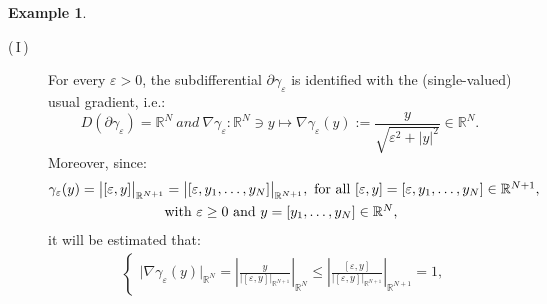 \documentclass{sinst}
\numberwithin{equation}{section}
\theoremstyle{plain}
\theoremstyle{definition}
\newtheorem{ex}{Example}
\def\R{\mathbb{R}}
\def\ds{\displaystyle}
\def\Sgn{\mathop{\mathrm{Sgr}}\nolimits}
\begin{document}
\begin{ex}
\begin{description}
\item[(\,I\,)]For every $ \varepsilon > 0 $, the subdifferential $\partial \gamma_\varepsilon$ is identified with the (single-valued) usual gradient, i.e.:
\begin{equation}
    D(\partial \gamma_\varepsilon) = \R^N ~and~\nabla \gamma_\varepsilon : \R^N \ni y \mapsto \nabla \gamma_\varepsilon(y) := \frac{y}{\sqrt{\varepsilon^2 + |y|^2}} \in \R^N.
\end{equation}
Moreover, since:
    \begin{align*}
        \gamma_\varepsilon(y) = \bigl| [\varepsilon, y] \bigr|_{\R^{N +1}} & =\bigl| [\varepsilon, y_1, \dots, y_N] \bigr|_{\R^{N +1}}, \mbox{ for all $ [\varepsilon, y] = [\varepsilon, y_1, \dots, y_N] \in \R^{N +1} $,}
        \\
        & \mbox{with $ \varepsilon \geq 0 $ and $ y = [y_1, \dots, y_N] \in \R^N $,}
    \end{align*}
    it will be estimated that:
    \begin{equation}
      \begin{aligned}
        & 
        \begin{cases} 
            \ds \bigl| \nabla \gamma_\varepsilon(y) \bigr|_{\R^{N}} = \left| \frac{y}{\bigl| [\varepsilon, y] \bigr|_{\mathbb{R}^{N +1}}} \right|_{\R^{N}} \leq \left| \frac{[\varepsilon, y]}{\bigl| [\varepsilon, y] \bigr|_{\mathbb{R}^{N +1}}} \right|_{\R^{N +1}} = 1,

\end{cases}
\end{aligned}
\end{equation}
\end{description}
\end{ex}
\end{document}
